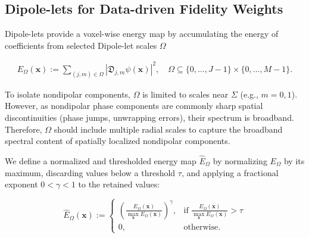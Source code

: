 \documentclass{article}
\newcommand{\bx}{\bm{x}}
\begin{document}
\subsection{Dipole-lets for Data-driven Fidelity Weights} \label{sec:methodsWeight}

Dipole-lets provide a voxel-wise energy map by accumulating the energy of coefficients from selected Dipole-let scales $\Omega$


\begin{equation}
\label{eqn:dipoleletEnergy}
\begin{aligned}
    E_{\Omega}(\bx):=
    \sum_{(j,m)\in\Omega}
    \left|\mathfrak{D}_{j,m}\psi(\bx)\right|^2, \quad
    \Omega \subseteq
    \{0,\ldots,J-1\}\times\{0,\ldots,M-1\}.
\end{aligned}
\end{equation}


\noindent
To isolate nondipolar components, $\Omega$ is limited to scales near $\Sigma$ (e.g., $m=0,1$). However, as nondipolar phase components are commonly sharp spatial discontinuities (phase jumps, unwrapping errors), their spectrum is broadband. Therefore, $\Omega$ should include multiple radial scales to capture the broadband spectral content of spatially localized nondipolar components.

We define a normalized and thresholded energy map
$\widehat{E}_{\Omega}$ by normalizing $E_{\Omega}$ by its maximum,
discarding values below a threshold $\tau$, and applying a fractional
exponent $0<\gamma<1$ to the retained values:



\begin{equation}
    \widehat{E}_{\Omega}(\bx) :=
    \begin{cases}
        \left(\frac{E_{\Omega}(\bx)}{\max\limits_{\bx}E_{\Omega}(\bx)}\right)^{\gamma}, & \text{if } \frac{E_{\Omega}(\bx)}{\max\limits_{\bx}E_{\Omega}(\bx)} > \tau \\
        0, & \text{otherwise.}
    \end{cases}
\end{equation}
\end{document}
